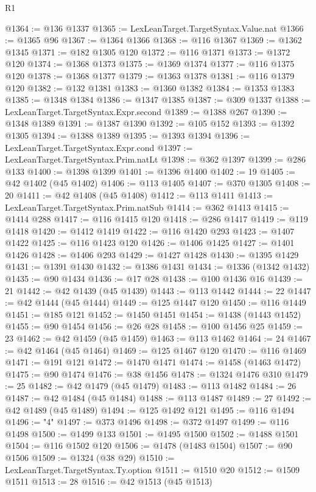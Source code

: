 \begin{lexlean}{R1}
\begin{coremodule}
@1364 := @136 @1337
@1365 := LexLeanTarget.TargetSyntax.Value.nat
@1366 := @1365 @96
@1367 := @1364 @1366
@1368 := @116 @1367
@1369 := @1362 @1345
@1371 := @182 @1305 @120
@1372 := @116 @1371
@1373 := @1372 @120
@1374 := @1368 @1373
@1375 := @1369 @1374
@1377 := @116 @1375 @120
@1378 := @1368 @1377
@1379 := @1363 @1378
@1381 := @116 @1379 @120
@1382 := @132 @1381
@1383 := @1360 @1382
@1384 := @1353 @1383
@1385 := @1348 @1384
@1386 := @1347 @1385
@1387 := @309 @1337
@1388 := LexLeanTarget.TargetSyntax.Expr.second
@1389 := @1388 @267
@1390 := @1348 @1389
@1391 := @1387 @1390
@1392 := @105 @152
@1393 := @1392 @1305
@1394 := @1388 @1389
@1395 := @1393 @1394
@1396 := LexLeanTarget.TargetSyntax.Expr.cond
@1397 := LexLeanTarget.TargetSyntax.Prim.natLt
@1398 := @362 @1397
@1399 := @286 @133
@1400 := @1398 @1399
@1401 := @1396 @1400
@1402 := 19
@1405 := @42 @1402 (@45 @1402)
@1406 := @113 @1405
@1407 := @370 @1305
@1408 := 20
@1411 := @42 @1408 (@45 @1408)
@1412 := @113 @1411
@1413 := LexLeanTarget.TargetSyntax.Prim.natSub
@1414 := @362 @1413
@1415 := @1414 @288
@1417 := @116 @1415 @120
@1418 := @286 @1417
@1419 := @119 @1418
@1420 := @1412 @1419
@1422 := @116 @1420 @293
@1423 := @1407 @1422
@1425 := @116 @1423 @120
@1426 := @1406 @1425
@1427 := @1401 @1426
@1428 := @1406 @293
@1429 := @1427 @1428
@1430 := @1395 @1429
@1431 := @1391 @1430
@1432 := @1386 @1431
@1434 := @1336 (@1342 @1432)
@1435 := @90 @1434
@1436 := @17 @28
@1438 := @100 @1436 @16
@1439 := 21
@1442 := @42 @1439 (@45 @1439)
@1443 := @113 @1442
@1444 := 22
@1447 := @42 @1444 (@45 @1444)
@1449 := @125 @1447 @120
@1450 := @116 @1449
@1451 := @185 @121
@1452 := @1450 @1451
@1454 := @1438 (@1443 @1452)
@1455 := @90 @1454
@1456 := @26 @28
@1458 := @100 @1456 @25
@1459 := 23
@1462 := @42 @1459 (@45 @1459)
@1463 := @113 @1462
@1464 := 24
@1467 := @42 @1464 (@45 @1464)
@1469 := @125 @1467 @120
@1470 := @116 @1469
@1471 := @191 @121
@1472 := @1470 @1471
@1474 := @1458 (@1463 @1472)
@1475 := @90 @1474
@1476 := @38 @1456
@1478 := @1324 @1476 @310
@1479 := 25
@1482 := @42 @1479 (@45 @1479)
@1483 := @113 @1482
@1484 := 26
@1487 := @42 @1484 (@45 @1484)
@1488 := @113 @1487
@1489 := 27
@1492 := @42 @1489 (@45 @1489)
@1494 := @125 @1492 @121
@1495 := @116 @1494
@1496 := "4"
@1497 := @373 @1496
@1498 := @372 @1497
@1499 := @116 @1498
@1500 := @1499 @133
@1501 := @1495 @1500
@1502 := @1488 @1501
@1504 := @116 @1502 @120
@1506 := @1478 (@1483 @1504)
@1507 := @90 @1506
@1509 := @1324 (@38 @29)
@1510 := LexLeanTarget.TargetSyntax.Ty.option
@1511 := @1510 @20
@1512 := @1509 @1511
@1513 := 28
@1516 := @42 @1513 (@45 @1513)

\end{coremodule}
\end{lexlean}
